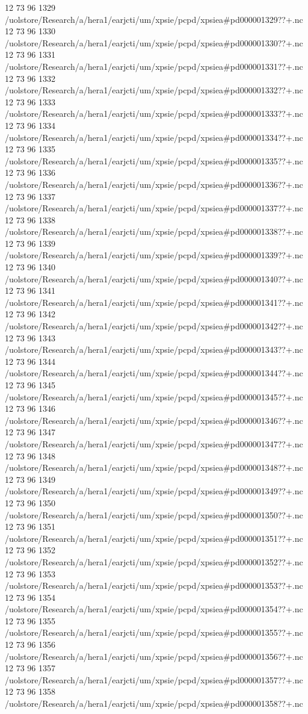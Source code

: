 12 73 96
1329
/uolstore/Research/a/hera1/earjcti/um/xpsie/pcpd/xpsiea#pd000001329??+.nc
12 73 96
1330
/uolstore/Research/a/hera1/earjcti/um/xpsie/pcpd/xpsiea#pd000001330??+.nc
12 73 96
1331
/uolstore/Research/a/hera1/earjcti/um/xpsie/pcpd/xpsiea#pd000001331??+.nc
12 73 96
1332
/uolstore/Research/a/hera1/earjcti/um/xpsie/pcpd/xpsiea#pd000001332??+.nc
12 73 96
1333
/uolstore/Research/a/hera1/earjcti/um/xpsie/pcpd/xpsiea#pd000001333??+.nc
12 73 96
1334
/uolstore/Research/a/hera1/earjcti/um/xpsie/pcpd/xpsiea#pd000001334??+.nc
12 73 96
1335
/uolstore/Research/a/hera1/earjcti/um/xpsie/pcpd/xpsiea#pd000001335??+.nc
12 73 96
1336
/uolstore/Research/a/hera1/earjcti/um/xpsie/pcpd/xpsiea#pd000001336??+.nc
12 73 96
1337
/uolstore/Research/a/hera1/earjcti/um/xpsie/pcpd/xpsiea#pd000001337??+.nc
12 73 96
1338
/uolstore/Research/a/hera1/earjcti/um/xpsie/pcpd/xpsiea#pd000001338??+.nc
12 73 96
1339
/uolstore/Research/a/hera1/earjcti/um/xpsie/pcpd/xpsiea#pd000001339??+.nc
12 73 96
1340
/uolstore/Research/a/hera1/earjcti/um/xpsie/pcpd/xpsiea#pd000001340??+.nc
12 73 96
1341
/uolstore/Research/a/hera1/earjcti/um/xpsie/pcpd/xpsiea#pd000001341??+.nc
12 73 96
1342
/uolstore/Research/a/hera1/earjcti/um/xpsie/pcpd/xpsiea#pd000001342??+.nc
12 73 96
1343
/uolstore/Research/a/hera1/earjcti/um/xpsie/pcpd/xpsiea#pd000001343??+.nc
12 73 96
1344
/uolstore/Research/a/hera1/earjcti/um/xpsie/pcpd/xpsiea#pd000001344??+.nc
12 73 96
1345
/uolstore/Research/a/hera1/earjcti/um/xpsie/pcpd/xpsiea#pd000001345??+.nc
12 73 96
1346
/uolstore/Research/a/hera1/earjcti/um/xpsie/pcpd/xpsiea#pd000001346??+.nc
12 73 96
1347
/uolstore/Research/a/hera1/earjcti/um/xpsie/pcpd/xpsiea#pd000001347??+.nc
12 73 96
1348
/uolstore/Research/a/hera1/earjcti/um/xpsie/pcpd/xpsiea#pd000001348??+.nc
12 73 96
1349
/uolstore/Research/a/hera1/earjcti/um/xpsie/pcpd/xpsiea#pd000001349??+.nc
12 73 96
1350
/uolstore/Research/a/hera1/earjcti/um/xpsie/pcpd/xpsiea#pd000001350??+.nc
12 73 96
1351
/uolstore/Research/a/hera1/earjcti/um/xpsie/pcpd/xpsiea#pd000001351??+.nc
12 73 96
1352
/uolstore/Research/a/hera1/earjcti/um/xpsie/pcpd/xpsiea#pd000001352??+.nc
12 73 96
1353
/uolstore/Research/a/hera1/earjcti/um/xpsie/pcpd/xpsiea#pd000001353??+.nc
12 73 96
1354
/uolstore/Research/a/hera1/earjcti/um/xpsie/pcpd/xpsiea#pd000001354??+.nc
12 73 96
1355
/uolstore/Research/a/hera1/earjcti/um/xpsie/pcpd/xpsiea#pd000001355??+.nc
12 73 96
1356
/uolstore/Research/a/hera1/earjcti/um/xpsie/pcpd/xpsiea#pd000001356??+.nc
12 73 96
1357
/uolstore/Research/a/hera1/earjcti/um/xpsie/pcpd/xpsiea#pd000001357??+.nc
12 73 96
1358
/uolstore/Research/a/hera1/earjcti/um/xpsie/pcpd/xpsiea#pd000001358??+.nc
